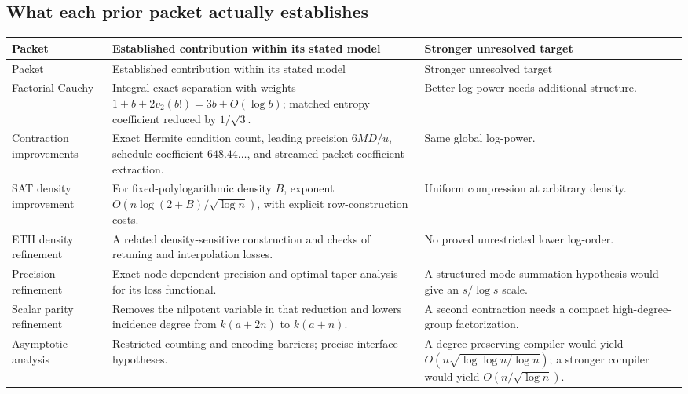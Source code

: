 \documentclass[11pt,letterpaper]{article}
\theoremstyle{definition}\newtheorem{definition}[theorem]{Definition}
\theoremstyle{remark}\newtheorem{remark}[theorem]{Remark}
\begin{document}
\subsection{What each prior packet actually establishes}
\begingroup\small
\begin{longtable}{@{}>{\raggedright\arraybackslash}p{}>{\raggedright\arraybackslash}p{}>{\raggedright\arraybackslash}p{}@{}}
\toprule
Packet & Established contribution within its stated model & Stronger unresolved target\\
\midrule\endfirsthead
\toprule Packet & Established contribution within its stated model & Stronger unresolved target\\\midrule\endhead
Factorial Cauchy~\cite{cauchypacket} & Integral exact separation with
 weights $1+b+2v_2(b!)=3b+O(\log b)$; matched entropy coefficient reduced
 by $1/\sqrt3$. & Better log-power needs additional structure.\\[0.5em]
Contraction improvements~\cite{schedulepacket} & Exact Hermite condition
 count, leading precision $6MD/u$, schedule coefficient $648.44\ldots$,
 and streamed packet coefficient extraction. & Same global log-power.\\[0.5em]
SAT density improvement~\cite{densitypacket} & For fixed-polylogarithmic
 density $B$, exponent $O(n\log(2+B)/\sqrt{\log n})$, with explicit
 row-construction costs. & Uniform compression at arbitrary density.\\[0.5em]
ETH density refinement~\cite{densitypacket2} & A related density-sensitive
 construction and checks of retuning and interpolation losses. & No proved
 unrestricted lower log-order.\\[0.5em]
Precision refinement~\cite{precisionpacket} & Exact node-dependent
 precision and optimal taper analysis for its loss functional. & A
 structured-mode summation hypothesis would give an $s/\log s$ scale.\\[0.5em]
Scalar parity refinement~\cite{scalarpacket} & Removes the nilpotent
 variable in that reduction and lowers incidence degree from
 $k(a+2n)$ to $k(a+n)$. & A second contraction needs a compact
 high-degree-group factorization.\\[0.5em]
Asymptotic analysis~\cite{analysispacket} & Restricted counting and
 encoding barriers; precise interface hypotheses. & A degree-preserving
 compiler would yield $O(n\sqrt{\log\log n/\log n})$;
 a stronger compiler would yield $O(n/\sqrt{\log n})$.\\
\bottomrule
\end{longtable}
\endgroup
\end{document}

